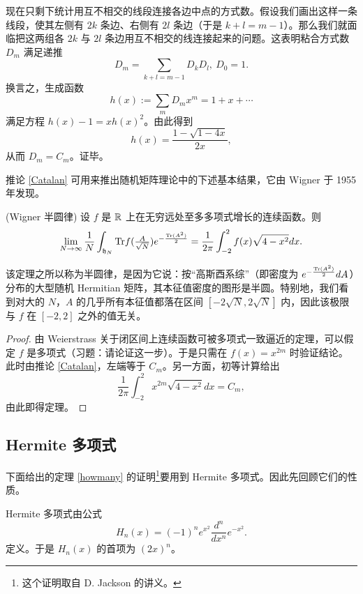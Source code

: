 现在只剩下统计用互不相交的线段连接各边中点的方式数。假设我们画出这样一条线段，使其左侧有 $2k$ 条边、右侧有 $2l$ 条边（于是 $k+l=m-1$）。那么我们就面临把这两组各 $2k$ 与 $2l$ 条边用互不相交的线连接起来的问题。这表明粘合方式数 $D_m$ 满足递推
$$
D_m=\sum_{k+l=m-1}D_kD_l,\ D_0=1.
$$
换言之，生成函数
$$
h(x):=\sum_m D_mx^m=1+x+ \cdots
$$ 
满足方程 $h(x)-1=xh(x)^2$。由此得到
$$
h(x)=\frac{1-\sqrt{1-4x}}{2x},
$$ 
从而 $D_m=C_m$。证毕。

推论 \ref{Catalan} 可用来推出随机矩阵理论中的下述基本结果，它由 Wigner 于 1955 年发现。

\begin{theorem} (Wigner 半圆律)
设 $f$ 是 $\Bbb R$ 上在无穷远处至多多项式增长的连续函数。则
$$
\lim_{N\to \infty} \frac{1}{N}\int_{{\frak h}_N}{\rm }{\rm Tr} f(\tfrac{A}{\sqrt{N}})e^{-\frac{{\rm Tr}(A^2)}{2}}=
\frac{1}{2\pi}\int_{-2}^2f(x)\sqrt{4-x^2}dx.
$$
\end{theorem}

该定理之所以称为半圆律，是因为它说：按“高斯酉系综”（即密度为 $e^{-\frac{\Tr(A^2)}{2}}dA$）分布的大型随机 Hermitian 矩阵，其本征值密度的图形是半圆。特别地，我们看到对大的 $N$，$A$ 的几乎所有本征值都落在区间 $[-2\sqrt{N},2\sqrt{N}]$ 内，因此该极限与 $f$ 在 $[-2,2]$ 之外的值无关。

\begin{proof} 
由 Weierstrass 关于闭区间上连续函数可被多项式一致逼近的定理，可以假定
$f$ 是多项式（习题：请论证这一步）。于是只需在
$f(x)=x^{2m}$ 时验证结论。此时由推论 \ref{Catalan}，左端等于 $C_m$。另一方面，初等计算给出
$$
\frac{1}{2\pi}\int_{-2}^2x^{2m}\sqrt{4-x^2}dx=C_m,
$$ 
由此即得定理。
\end{proof}

\subsection{Hermite 多项式}

下面给出的定理 \ref{howmany} 的证明\footnote{这个证明取自 D. Jackson 的讲义。}要用到 Hermite 多项式。因此先回顾它们的性质。

Hermite 多项式由公式
$$
H_n(x)=(-1)^ne^{x^2}\frac{d^n}{dx^n}e^{-x^2}.
$$
定义。于是 $H_n(x)$ 的首项为 $(2x)^n$。

